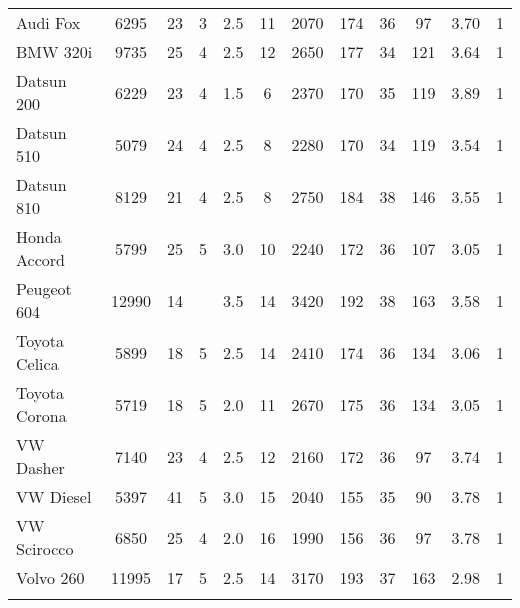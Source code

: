 \documentclass{article}
\begin{document}
\begin{table}[tbp]
{\begin{tabularx}{\linewidth}{lCCCCCCCCCCC}
Audi Fox&6295&23&3&2.5&11&2070&174&36&97&3.70&1 \tabularnewline \addlinespace[0.1cm]
BMW 320i&9735&25&4&2.5&12&2650&177&34&121&3.64&1 \tabularnewline \addlinespace[0.1cm]
Datsun 200&6229&23&4&1.5&6&2370&170&35&119&3.89&1 \tabularnewline \addlinespace[0.1cm]
Datsun 510&5079&24&4&2.5&8&2280&170&34&119&3.54&1 \tabularnewline \addlinespace[0.1cm]
Datsun 810&8129&21&4&2.5&8&2750&184&38&146&3.55&1 \tabularnewline \addlinespace[0.1cm]
Honda Accord&5799&25&5&3.0&10&2240&172&36&107&3.05&1 \tabularnewline \addlinespace[0.1cm]
Peugeot 604&12990&14&&3.5&14&3420&192&38&163&3.58&1 \tabularnewline \addlinespace[0.1cm]
Toyota Celica&5899&18&5&2.5&14&2410&174&36&134&3.06&1 \tabularnewline \addlinespace[0.1cm]
Toyota Corona&5719&18&5&2.0&11&2670&175&36&134&3.05&1 \tabularnewline \addlinespace[0.1cm]
VW Dasher&7140&23&4&2.5&12&2160&172&36&97&3.74&1 \tabularnewline \addlinespace[0.1cm]
VW Diesel&5397&41&5&3.0&15&2040&155&35&90&3.78&1 \tabularnewline \addlinespace[0.1cm]
VW Scirocco&6850&25&4&2.0&16&1990&156&36&97&3.78&1 \tabularnewline \addlinespace[0.1cm]
Volvo 260&11995&17&5&2.5&14&3170&193&37&163&2.98&1 \tabularnewline \addlinespace[0.1cm]
\bottomrule 

\end{tabularx}
}
\end{table}
\end{document}
